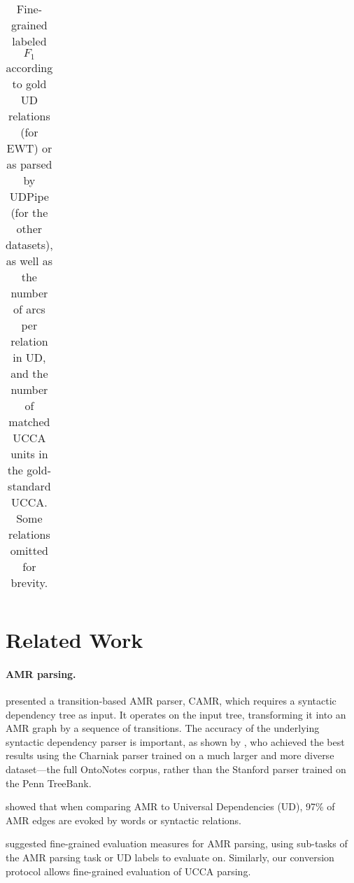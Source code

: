 \documentclass[11pt,a4paper]{article}
\begin{document}
\begin{table*}[t]
\centering
\tiny
\setlength\tabcolsep{2pt}
\begin{tabular}{l|ccccccccccccccccccccccccccccccc}
&  \\
\hline
\end{tabular}
\caption{
Fine-grained labeled $F_1$ according to gold UD relations (for EWT)
or as parsed by UDPipe (for the other datasets),
as well as the number of arcs per relation in UD,
and the number of matched UCCA units in the gold-standard UCCA.
Some relations omitted for brevity.}
\label{tab:fine_grained_ud}
\end{table*}




\section{Related Work}\label{sec:related_work}

\paragraph{AMR parsing.}

presented a transition-based AMR parser, CAMR, which requires a
syntactic dependency tree as input.
It operates on the input tree, transforming it into an AMR graph
by a sequence of transitions.
The accuracy of the underlying syntactic dependency parser is important,
as shown by ,
who achieved the best results using the Charniak parser trained on a
much larger and more diverse dataset---the full OntoNotes corpus,
rather than the Stanford parser trained on the Penn TreeBank.

 showed that when comparing AMR to Universal Dependencies (UD),
97\% of AMR edges are evoked by words or syntactic relations.

 suggested fine-grained evaluation measures
for AMR parsing, using sub-tasks of the AMR parsing task or UD labels to evaluate on.
Similarly, our conversion protocol allows fine-grained evaluation of UCCA parsing.
\end{document}
